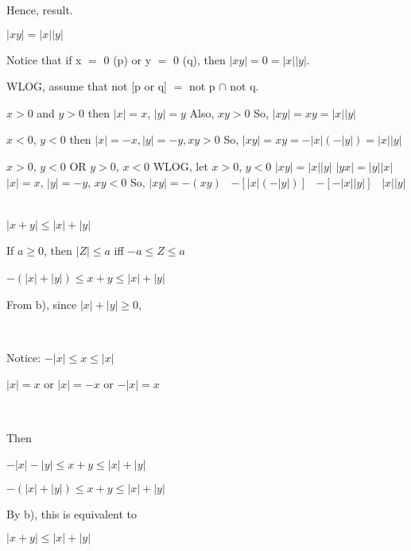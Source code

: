 \documentclass{article}
\begin{document}
Hence, result.

 $|xy| = |x||y|$

Notice that if x $=$ 0 (p) or y $=$ 0 (q), then $|xy| = 0 = |x||y|$.

WLOG, assume that not [p or q] $=$ not p $\cap$ not q.

\bilist
\item $x > 0$ and $y > 0$
	then $|x| = x$, $|y| = y$
	Also, $xy > 0$
	So, $|xy| = xy = |x||y|$
\item $x < 0$, $y < 0$
	then $|x| = -x, |y| = -y, xy > 0$
	So, $|xy| = xy = -|x|(-|y|) = |x||y|$
\item $x > 0$, $y < 0$ OR $y > 0$, $x < 0$
	WLOG, let $x > 0$, $y < 0$
	$|xy| = |x||y|$
	$|yx| = |y||x|$
	$|x| = x$, $|y| = -y$, $xy < 0$
	So, $|xy| = -(xy)$ \
		$-[|x|(-|y|)]$ \ 
		$-[-|x||y|]$ \
		$|x||y|$ \ 
\elist
	
 $|x + y| \leq |x| + |y|$ \


If $a \geq 0$, then $|Z| \leq a$ iff $-a \leq Z \leq a$

$-(|x| + |y|) \leq x + y \leq |x| + |y|$ \

From b), since $|x| + |y| \geq 0$, \

\


Notice: $-|x| \leq x \leq |x|$

$|x| = x$ or $|x| = -x$ or $-|x| = x$ \

\

Then \

$-|x| - |y| \leq x + y \leq |x| + |y|$ \

$-(|x| + |y|) \leq x + y \leq |x| + |y|$

By b), this is equivalent to \

$|x + y| \leq |x| + |y|$

\epf
\end{document}
